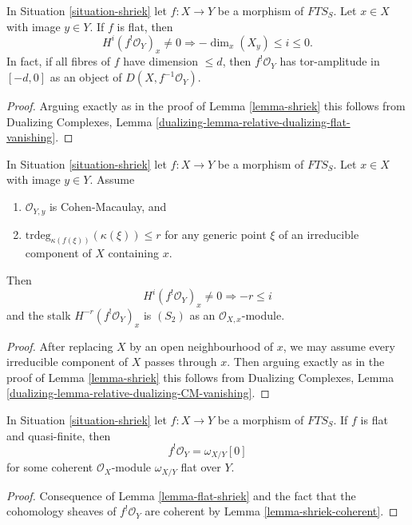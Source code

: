 \begin{lemma}
\label{lemma-flat-shriek}
In Situation \ref{situation-shriek} let $f : X \to Y$ be a morphism of
$\textit{FTS}_S$. Let $x \in X$ with image $y \in Y$.
If $f$ is flat, then
$$
H^i(f^!\mathcal{O}_Y)_x \not = 0
\Rightarrow - \dim_x(X_y) \leq i \leq 0.
$$
In fact, if all fibres of $f$ have dimension $\leq d$, then
$f^!\mathcal{O}_Y$ has tor-amplitude in $[-d, 0]$ as an object
of $D(X, f^{-1}\mathcal{O}_Y)$.
\end{lemma}

\begin{proof}
Arguing exactly as in the proof of Lemma \ref{lemma-shriek}
this follows from Dualizing Complexes, Lemma
\ref{dualizing-lemma-relative-dualizing-flat-vanishing}.
\end{proof}

\begin{lemma}
\label{lemma-shriek-over-CM}
In Situation \ref{situation-shriek} let $f : X \to Y$ be a morphism of
$\textit{FTS}_S$. Let $x \in X$ with image $y \in Y$. Assume
\begin{enumerate}
\item $\mathcal{O}_{Y, y}$ is Cohen-Macaulay, and
\item $\text{trdeg}_{\kappa(f(\xi))}(\kappa(\xi)) \leq r$
for any generic point $\xi$ of an irreducible component
of $X$ containing $x$.
\end{enumerate}
Then
$$
H^i(f^!\mathcal{O}_Y)_x \not = 0
\Rightarrow - r \leq i
$$
and the stalk $H^{-r}(f^!\mathcal{O}_Y)_x$ is $(S_2)$ as an
$\mathcal{O}_{X, x}$-module.
\end{lemma}

\begin{proof}
After replacing $X$ by an open neighbourhood of $x$, we may
assume every irreducible component of $X$ passes through $x$.
Then arguing exactly as in the proof of Lemma \ref{lemma-shriek}
this follows from Dualizing Complexes, Lemma
\ref{dualizing-lemma-relative-dualizing-CM-vanishing}.
\end{proof}

\begin{lemma}
\label{lemma-flat-quasi-finite-shriek}
In Situation \ref{situation-shriek} let $f : X \to Y$ be a morphism of
$\textit{FTS}_S$. If $f$ is flat and quasi-finite, then
$$
f^!\mathcal{O}_Y = \omega_{X/Y}[0]
$$
for some coherent $\mathcal{O}_X$-module $\omega_{X/Y}$ flat over $Y$.
\end{lemma}

\begin{proof}
Consequence of Lemma \ref{lemma-flat-shriek} and the fact that the
cohomology sheaves of $f^!\mathcal{O}_Y$ are coherent by
Lemma \ref{lemma-shriek-coherent}.
\end{proof}

